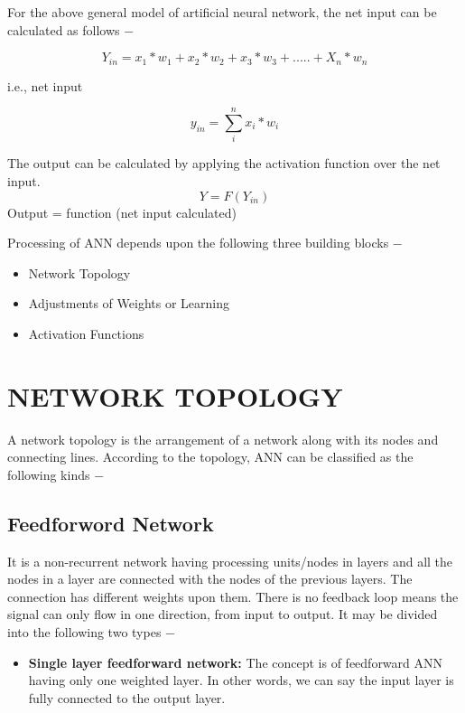 \documentclass{report}
\begin{document}
For the above general model of artificial neural network, the net input can be calculated as follows −

\[Y_{in} = x_{1}*w_{1} + x_{2}*w_{2} + x_{3}*w_{3} + .....+ X_{n}*w_{n}\]

i.e., net input

\[y_{in} = \sum_{i}^{n} x_{i}*w_{i}\]

The output can be calculated by applying the activation function over the net input.
\[Y = F(Y_{in})\]
Output = function (net input calculated)

Processing of ANN depends upon the following three building blocks −

\begin{itemize}
\item Network Topology
\item Adjustments of Weights or Learning
\item Activation Functions

\end{itemize}

\section{NETWORK TOPOLOGY}
A network topology \cite{Network Topology} is the arrangement of a network along with its nodes and connecting lines. According to the topology, ANN can be classified as the following kinds −

\subsection{Feedforword Network}
It is a non-recurrent network having processing units/nodes in layers and all the nodes in a layer are connected with the nodes of the previous layers. The connection has different weights upon them. There is no feedback loop means the signal can only flow in one direction, from input to output. It may be divided into the following two types −

\begin{itemize}
\item \textbf{Single layer feedforward network: } The concept is of feedforward ANN having only one weighted layer. In other words, we can say the input layer is fully connected to the output layer.

\end{itemize}
\end{document}
